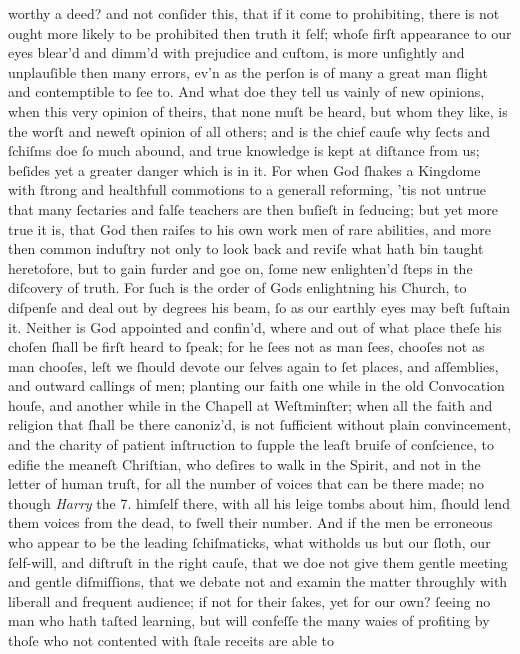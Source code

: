 worthy a deed? and not conſider this, that if it come to prohibiting, there is
not ought more likely to be prohibited then truth it ſelf; whoſe firſt
appearance to our eyes blear'd and dimm'd with prejudice and cuſtom, is more
unſightly and unplauſible then many errors, ev'n as the perſon is of many a
great man ſlight and contemptible to ſee to.  And what doe they tell us vainly
of new opinions, when this very opinion of theirs, that none muſt be heard, but
whom they like, is the worſt and neweſt opinion of all others; and is the chief
cauſe why ſects and ſchiſms doe ſo much abound, and true knowledge is kept at
diſtance from us; beſides yet a greater danger which is in it.  For when God
ſhakes a Kingdome with ſtrong and healthfull commotions to a generall reforming,
'tis not untrue that many ſectaries and falſe teachers are then buſieſt in
ſeducing; but yet more true it is, that God then raiſes to his own work men of
rare abilities, and more then common induſtry not only to look back and reviſe
what hath bin taught heretofore, but to gain furder and goe on, ſome new
enlighten'd ſteps in the diſcovery of truth.  For ſuch is the order of Gods
enlightning his Church, to diſpenſe and deal out by degrees his beam, ſo as our
earthly eyes may beſt ſuſtain it.  Neither is God appointed and confin'd, where
and out of what place theſe his choſen ſhall be firſt heard to ſpeak; for he
ſees not as man ſees, chooſes not as man chooſes, leſt we ſhould devote our
ſelves again to ſet places, and aſſemblies, and outward callings of men;
planting our faith one while in the old Convocation houſe, and another while in
the Chapell at Weſtminſter; when all the faith and religion that ſhall be there
canoniz'd, is not ſufficient without plain convincement, and the charity of
patient inſtruction to ſupple the leaſt bruiſe of conſcience, to edifie the
meaneſt Chriſtian, who deſires to walk in the Spirit, and not in the letter of
human truſt, for all the number of voices that can be there made; no though
\textit{Harry} the 7. himſelf there, with all his leige tombs about him, ſhould
lend them voices from the dead, to ſwell their number.  And if the men be
erroneous who appear to be the leading ſchiſmaticks, what witholds us but our
ſloth, our ſelf-will, and diſtruſt in the right cauſe, that we doe not give them
gentle meeting and gentle diſmiſſions, that we debate not and examin the matter
throughly with liberall and frequent audience; if not for their ſakes, yet for
our own? ſeeing no man who hath taſted learning, but will confeſſe the many
waies of profiting by thoſe who not contented with ſtale receits are able to
